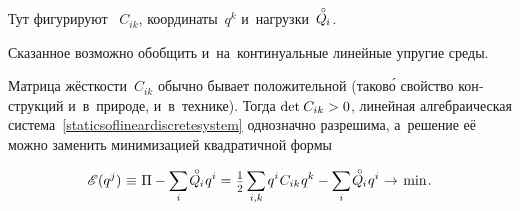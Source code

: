 \begin{otherlanguage}{russian}
\vspace{-0.2em}\noindent
Тут фигурируют ~$C_{ik}$, координаты~${q^k}$ и~нагрузки~${\mathcircabove{Q}_{\hspace{-0.1ex}i}}$.

Сказанное возможно обобщить и~на~континуальные линейные упругие среды.

Матрица жёсткости~${C_{ik}}$ обычно бывает положительной (таков\'{о} свойство конструкций и~в~природе, и~в~технике).
Тогда ${\operatorname{det} \hspace{.16ex} C_{ik} > 0}$, линейная алгебраическая система~\eqref{staticsoflineardiscretesystem} однозначно разрешима, а~решение её можно заменить минимизацией квадратичной формы

\nopagebreak\vspace{-0.1em}\begin{equation}\label{discrete:potentialenergyofsystem}
\potentialenergyfunctional \hspace{.2ex} (q^{j}) \hspace{.1ex}
\equiv \hspace{.1ex}
\potential - \scalebox{0.95}[1]{$\displaystyle \sum_{\smash{i}}$} \hspace{.2ex}
\mathcircabove{Q}_{\hspace{-0.1ex}i} \hspace{.12ex} q^{i}
%
= \hspace{.1ex}
\smalldisplaystyleonehalf \hspace{.32ex}
\scalebox{0.95}[1]{$\displaystyle \sum_{\smash{i,k}}$} \hspace{.2ex}
\hspace{.1ex} q^{i} \hspace{.1ex} C_{ik} \hspace{.1ex} q^{k}
- \scalebox{0.95}[1]{$\displaystyle \sum_{\smash{i}}$} \hspace{.2ex}
\mathcircabove{Q}_{\hspace{-0.1ex}i} \hspace{.12ex} q^{i}
%
\hspace{.1ex}\to\hspace{.25ex} \mathrm{min}
\hspace{.16ex} .
\vspace{-0.1em}\end{equation}


\end{otherlanguage}
